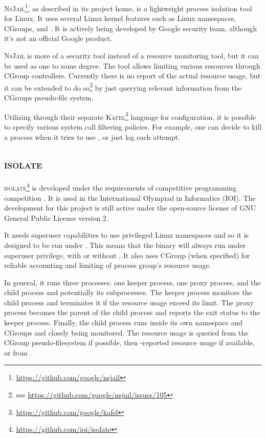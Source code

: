 \textsc{NsJail}\footnote{\href{https://github.com/google/nsjail}{https://github.com/google/nsjail}}, as described in its project home, is a lightweight process isolation tool for Linux.
It uses several Linux kernel features such as Linux namespaces, CGroups, and .
It is actively being developed by Google security team, although it's not an official Google product.

\textsc{NsJail} is more of a security tool instead of a resource monitoring tool, but it can be used as one to some degree.
The tool allows limiting various resources through CGroup controllers.
Currently there is no report of the actual resource usage, but it can be extended to do so\footnote{see \href{https://github.com/google/nsjail/issues/105}{https://github.com/google/nsjail/issues/105}} by just querying relevant information from the CGroups pseudo-file system.

Utilizing  through their separate \textsc{Kafel}\footnote{\href{https://github.com/google/kafel}{https://github.com/google/kafel}} language for configuration, it is possible to specify various system call filtering policies.
For example, one can decide to kill a process when it tries to use , or just log each attempt.


\subsection{\textsc{isolate}}

\textsc{isolate}\footnote{\href{https://github.com/ioi/isolate}{https://github.com/ioi/isolate}} is developed under the requirements of competitive programming competition \citep{marevs2012new}.
It is used in the International Olympiad in Informatics (IOI).
The development for this project is still active under the open-source license of GNU General Public License version 2.

It needs superuser capabilities to use privileged Linux namespaces and so it is designed to be run under .
This means that the binary will always run under superuser privilege, with or without .
It also uses CGroup (when specified) for reliable accounting and limiting of process group's resource usage.

In general, it runs three processes: one keeper process, one proxy process, and the child process and potentially its subprocesses.
The keeper process monitors the child process and terminates it if the resource usage exceed its limit.
The proxy process becomes the parent of the child process and reports the exit status to the keeper process.
Finally, the child process runs inside its own namespace and CGroups and closely being monitored.
The resource usage is queried from the CGroup pseudo-filesystem if possible, then -reported resource usage if available, or from .


